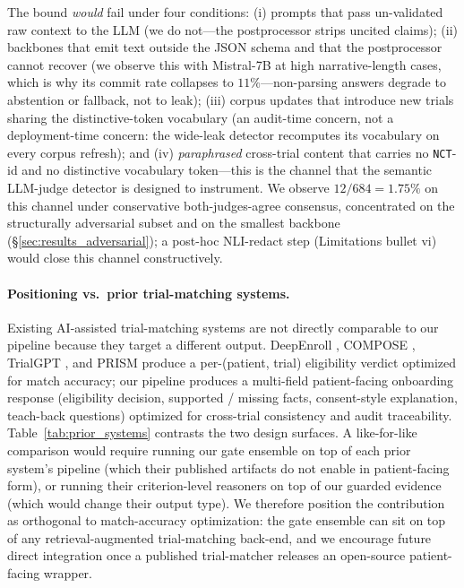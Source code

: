 \documentclass[11pt]{article}
\begin{document}
The bound \emph{would} fail under four conditions: (i) prompts that pass un-validated raw context to the LLM (we do not---the postprocessor strips uncited claims); (ii) backbones that emit text outside the JSON schema and that the postprocessor cannot recover (we observe this with Mistral-7B at high narrative-length cases, which is why its commit rate collapses to $11\%$---non-parsing answers degrade to abstention or fallback, not to leak); (iii) corpus updates that introduce new trials sharing the distinctive-token vocabulary (an audit-time concern, not a deployment-time concern: the wide-leak detector recomputes its vocabulary on every corpus refresh); and (iv) \emph{paraphrased} cross-trial content that carries no \texttt{NCT}-id and no distinctive vocabulary token---this is the channel that the semantic LLM-judge detector is designed to instrument. We observe $12/684 = 1.75\%$ on this channel under conservative both-judges-agree consensus, concentrated on the structurally adversarial subset and on the smallest backbone (\S\ref{sec:results_adversarial}); a post-hoc NLI-redact step (Limitations bullet vi) would close this channel constructively.

\paragraph{Positioning vs.\ prior trial-matching systems.}
Existing AI-assisted trial-matching systems are not directly comparable to our pipeline because they target a different output. DeepEnroll \citep{zhang2020deepenroll}, COMPOSE \citep{gao2020compose}, TrialGPT \citep{jin2024trialgpt}, and PRISM \citep{gupta2024prism} produce a per-(patient, trial) eligibility verdict optimized for match accuracy; our pipeline produces a multi-field patient-facing onboarding response (eligibility decision, supported / missing facts, consent-style explanation, teach-back questions) optimized for cross-trial consistency and audit traceability. Table~\ref{tab:prior_systems} contrasts the two design surfaces. A like-for-like comparison would require running our gate ensemble on top of each prior system's pipeline (which their published artifacts do not enable in patient-facing form), or running their criterion-level reasoners on top of our guarded evidence (which would change their output type). We therefore position the contribution as orthogonal to match-accuracy optimization: the gate ensemble can sit on top of any retrieval-augmented trial-matching back-end, and we encourage future direct integration once a published trial-matcher releases an open-source patient-facing wrapper.
\end{document}
